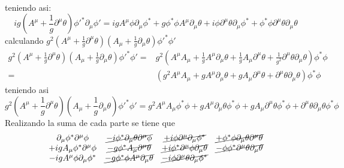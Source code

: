 \begin{itemize}
\begin{align*}
    \end{align*}
    teniendo asi:
    \begin{equation*}
        ig \left(A^\mu+ \frac{1}{g}\partial^\mu \theta\right) {\phi}'^* \partial_\mu {\phi}' =
         igA^\mu \phi \partial_\mu \phi^* 
         + g\phi^* \phi A^\mu \partial_\mu \theta 
         +i \phi \partial^\mu \theta\partial_\mu \phi^* 
         + \phi^* \phi \partial^\mu \theta\partial_\mu \theta
    \end{equation*}
    calculando $g^2 \left(A^\mu+ \frac{1}{g}\partial^\mu \theta\right) \left(A_\mu+ \frac{1}{g}\partial_\mu \theta\right) {\phi}'^* {\phi}'$
    \begin{align*}
        g^2 \left(A^\mu+ \frac{1}{g}\partial^\mu \theta\right) \left(A_\mu+ \frac{1}{g}\partial_\mu \theta\right) {\phi}'^* {\phi}' =& g^2 \left(A^\mu A_\mu + \frac{1}{g}A^\mu \partial_\mu \theta + \frac{1}{g}A_\mu \partial^\mu \theta + \frac{1}{g^2}\partial^\mu \theta \partial_\mu \theta \right) \phi^* \phi \\
        =&\left(g^2A^\mu A_\mu + gA^\mu \partial_\mu \theta + gA_\mu \partial^\mu \theta + \partial^\mu \theta \partial_\mu \theta \right) \phi^* \phi 
    \end{align*}
    teniendo asi 
    \begin{equation*}
        g^2 \left(A^\mu+ \frac{1}{g}\partial^\mu \theta\right) \left(A_\mu+ \frac{1}{g}\partial_\mu \theta\right) {\phi}'^* {\phi}' =
         g^2A^\mu A_\mu\phi^* \phi  
         + gA^\mu \partial_\mu \theta\phi^* \phi  
         + gA_\mu \partial^\mu \theta\phi^* \phi 
          + \partial^\mu \theta \partial_\mu \theta\phi^* \phi 
    \end{equation*}
    Realizando la suma de cada parte se tiene que
    \begin{equation*}
    \begin{matrix}
        \partial_\mu \phi^* \partial^\mu \phi 
        &\cancel{- i \phi^* \partial_\mu \theta \partial^\mu \phi }
        &\cancel{+ i \phi \partial^\mu \partial_\mu \phi^* }
        &\cancel{+ \phi^* \phi \partial_\mu \theta \partial^\mu \theta}\\
         +igA_\mu \phi^* \partial^\mu \phi
        &\cancel{ - g\phi^* A_\mu \partial^\mu \theta}
        &\cancel{ + i \phi^* \partial^\mu \phi \partial_\mu \theta}
        &\cancel{ - \phi \phi^* \partial^\mu \theta \partial_\mu \theta}\\
         -igA^\mu \phi \partial_\mu \phi^* 
        &\cancel{- g\phi^* \phi A^\mu \partial_\mu \theta }
        &\cancel{-i \phi \partial^\mu \theta\partial_\mu \phi^* }

\end{matrix}
\end{equation*}
\end{itemize}
